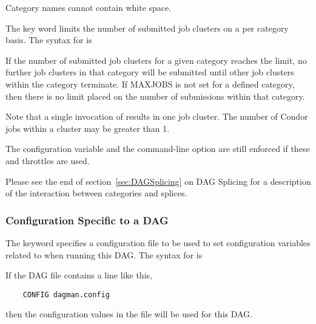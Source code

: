   

Category names cannot contain white space.

The  key word limits the number of submitted job clusters
on a per category basis.
The syntax for  is

  

If the number of submitted job clusters for a given category reaches the limit,
no further job clusters in that category will be submitted until other
job clusters within the category terminate.
If MAXJOBS is not set for a defined category,
then there is no limit placed on the number of submissions
within that category.

Note that a single invocation
of  results in one job cluster.
The number of Condor jobs within a cluster may be greater than 1. 

The  configuration variable  
and the   command-line option
are still enforced if these  and  throttles are used.

Please see the end of section~\ref{sec:DAGSplicing}
on DAG Splicing for a description of the interaction between
categories and splices.

\subsubsection{\label{sec:DAG-configuration}Configuration Specific to a DAG}

The  keyword specifies a configuration file to be used
to set configuration variables related to 
when running this DAG.
The syntax for  is

 

If the DAG file contains a line like this,
\begin{verbatim}
    CONFIG dagman.config
\end{verbatim}
then the configuration values in the file  will be used
for this DAG.

